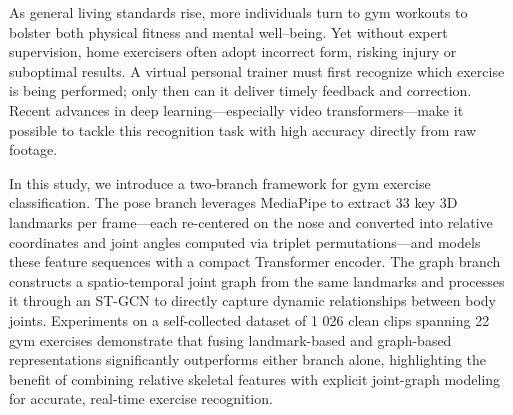 \documentclass[journal,onecolumn, 11pt]{IEEEtran}
\begin{document}
As general living standards rise, more individuals turn to gym workouts to bolster both physical fitness and mental well–being. Yet without expert supervision, home exercisers often adopt incorrect form, risking injury or suboptimal results. A virtual personal trainer must first recognize which exercise is being performed; only then can it deliver timely feedback and correction. Recent advances in deep learning—especially video transformers—make it possible to tackle this recognition task with high accuracy directly from raw footage.



In this study, we introduce a two-branch framework for gym exercise classification. The pose branch leverages MediaPipe to extract 33 key 3D landmarks per frame—each re-centered on the nose and converted into relative coordinates and joint angles computed via triplet permutations—and models these feature sequences with a compact Transformer encoder. The graph branch constructs a spatio-temporal joint graph from the same landmarks and processes it through an ST-GCN to directly capture dynamic relationships between body joints. Experiments on a self-collected dataset of 1 026 clean clips spanning 22 gym exercises demonstrate that fusing landmark-based and graph-based representations significantly outperforms either branch alone, highlighting the benefit of combining relative skeletal features with explicit joint-graph modeling for accurate, real-time exercise recognition.
\end{document}
